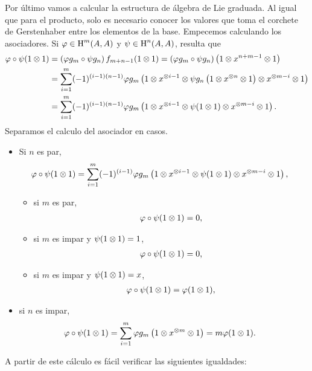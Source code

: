 \documentclass[a4paper,oneside,fleqn,11pt,../tesis.tex]{subfiles}
\begin{document}
\begin{example}
	Por último vamos a calcular la estructura de álgebra de Lie graduada. Al igual que para el producto, solo es necesario
	conocer los valores que toma el corchete de Gerstenhaber entre los elementos de la base. Empecemos calculando los asociadores.
	Si $\varphi \in \operatorname{H}^{m}(A,A)$ y $\psi \in \operatorname{H}^{n}(A,A)$, resulta que
	\begin{align*}
		\varphi \circ \psi(1\otimes 1) &= \left(\varphi g_m \circ \psi g_n\right) f_{m + n - 1}(1\otimes 1)
			= \left(\varphi g_m \circ \psi g_n\right) \left(1\otimes x^{n + m - 1} \otimes 1\right)\\
		&= \sum_{i = 1}^{m}(-1)^{(i -1)(n - 1)}
			\varphi g_m\left(1\otimes x^{\otimes i - 1}\otimes \psi g_n\left(1 \otimes x^{\otimes n} \otimes 1\right)\otimes x^{\otimes m -i}\otimes 1\right)\\
		&= \sum_{i = 1}^{m}(-1)^{(i -1)(n - 1)}\varphi g_m\left(1\otimes x^{\otimes i - 1}\otimes \psi (1\otimes 1)\otimes x^{\otimes m -i}\otimes 1\right).
	\end{align*}
	Separamos el calculo del asociador en casos.
	\begin{itemize}
		\item Si $n$ es par,
		\begin{align*}
			\varphi \circ \psi(1\otimes 1) &=
				\sum_{i = 1}^{m}(-1)^{(i -1)}\varphi g_m\left(1\otimes x^{\otimes i - 1}\otimes \psi (1\otimes 1)\otimes x^{\otimes m -i}\otimes 1\right),
		\end{align*}
		\begin{itemize}
			\item si $m$ es par,
				\begin{align*}
					\varphi \circ \psi(1\otimes 1) = 0,
				\end{align*}
			\item si $m$ es impar y $\psi(1\otimes 1) = 1$,
				\begin{align*}
					\varphi \circ \psi(1\otimes 1) = 0,
				\end{align*}
			\item si $m$ es impar y $\psi(1\otimes 1) = x$,
				\begin{align*}
					\varphi \circ \psi(1\otimes 1) = \varphi(1 \otimes 1),
				\end{align*}
		\end{itemize}
	\item si $n$ es impar,
	\begin{align*}
		\varphi \circ \psi(1\otimes 1) &=
			\sum_{i = 1}^{m} \varphi g_m\left(1\otimes x^{\otimes m}\otimes 1\right) = m\varphi(1\otimes 1).
	\end{align*}
	\end{itemize}
	A partir de este cálculo es fácil verificar las siguientes igualdades:

\end{example}
\end{document}
